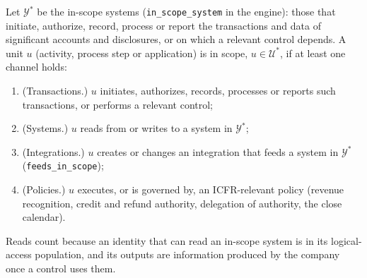 \begin{definition}\label{def:acct-scope}
Let $\mathcal Y^*$ be the in-scope systems (\texttt{in\_scope\_system} in the engine): those that initiate, authorize, record, process or report the transactions and data of significant accounts and disclosures, or on which a relevant control depends. A unit $u$ (activity, process step or application) is in scope, $u\in\mathcal U^*$, if at least one channel holds:
\begin{enumerate}
\item[(T)] (Transactions.) $u$ initiates, authorizes, records, processes or reports such transactions, or performs a relevant control;
\item[(S)] (Systems.) $u$ reads from or writes to a system in $\mathcal Y^*$;
\item[(I)] (Integrations.) $u$ creates or changes an integration that feeds a system in $\mathcal Y^*$ (\texttt{feeds\_in\_scope});
\item[(P)] (Policies.) $u$ executes, or is governed by, an ICFR-relevant policy (revenue recognition, credit and refund authority, delegation of authority, the close calendar).
\end{enumerate}
Reads count because an identity that can read an in-scope system is in its logical-access population, and its outputs are information produced by the company once a control uses them.
\end{definition}

